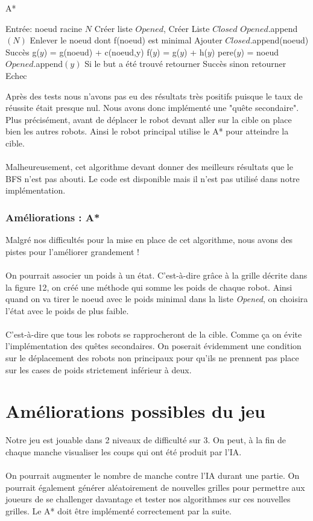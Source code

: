 \documentclass{article}
\begin{document}
\begin{algorithm}[H]
\caption{A*}
\label{alg:dfs-reach}
\begin{algorithmic}[3]
  \STATE Entrée: noeud racine  $N$
  \STATE Créer liste $Opened$, Créer Liste $Closed$
  \STATE $Opened$.append$(N)$
    \STATE Enlever le noeud dont f(noeud) est minimal
    \STATE Ajouter $Closed$.append(noeud)
    		\RETURN Succès
    \ELSE
    				\STATE g($y$) = g(noeud) + c(noeud,y)
    				\STATE f($y$) = g($y$) + h($y$)
    				\STATE pere($y$) = noeud
    				\STATE $Opened$.append$(y)$
    			\ENDIF
    		\ENDFOR
    	\ENDIF
  \ENDWHILE
  \STATE Si le but a été trouvé retourner Succès sinon retourner Echec
\end{algorithmic}
\end{algorithm}
Après des tests nous n'avons pas eu des résultats très positifs puisque le taux de réussite était presque nul. Nous avons donc implémenté une "quête secondaire". Plus précisément, avant de déplacer le robot devant aller sur la cible on place bien les autres robots. Ainsi le robot principal utilise le A* pour atteindre la cible.\\\\
Malheureusement, cet algorithme devant donner des meilleurs résultats que le BFS n'est pas abouti. Le code est disponible mais il n'est pas utilisé dans notre implémentation.
\subsubsection{Améliorations : A*}
Malgré nos difficultés pour la mise en place de cet algorithme, nous avons des pistes pour l'améliorer grandement !\\\\
On pourrait associer un poids à un état. C'est-à-dire grâce à la grille décrite dans la figure 12, on créé une méthode qui somme les poids de chaque robot. Ainsi quand on va tirer le noeud avec le poids minimal dans la liste \textit{Opened}, on choisira l'état avec le poids de plus faible.\\\\
C'est-à-dire que tous les robots se rapprocheront de la cible. Comme ça on évite l'implémentation des quêtes secondaires. On poserait évidemment une condition sur le déplacement des robots non principaux pour qu'ils ne prennent pas place sur les cases de poids strictement inférieur à deux.   
\section{Améliorations possibles du jeu}
Notre jeu est jouable dans 2 niveaux de difficulté sur 3. On peut, à la fin de chaque manche visualiser les coups qui ont été produit par l'IA.\\\\
On pourrait augmenter le nombre de manche contre l'IA durant une partie. On pourrait également générer aléatoirement de nouvelles grilles pour permettre aux joueurs de se challenger davantage et tester nos algorithmes sur ces nouvelles grilles. Le A* doit être implémenté correctement par la suite. 
\end{document}
